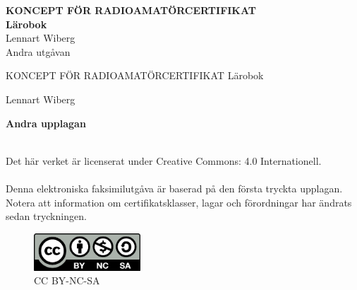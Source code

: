 \documentclass[a4paper,twoside,openright]{book}
\begin{document}
\AddToShipoutPicture*{\Backgroundtwo}

\pagestyle{empty}



\onecolumn
\vspace{3cm}
\begin{center}
\Huge{\bfseries{\color{white}KONCEPT FÖR RADIO\-AMATÖRCERTIFIKAT}} \\[2ex]
\Huge{\bfseries{\color{white}Lärobok}} \\[2ex]
\huge{\color{white}Lennart Wiberg} \\
\Large{\color{white}Andra utgåvan}
\end{center}

\clearpage





\vspace{10em}

\begin{center}
\Large{KONCEPT FÖR RADIOAMATÖRCERTIFIKAT}
\Large{Lärobok}

Lennart Wiberg\\[2\baselineskip]
\end{center}


\noindent \textbf{Andra upplagan}
\begin{rev-granskat}[UEI]
\noindent
\\ 
\noindent Det här verket är licenserat under Creative Commons:\newline
\noindent{} 4.0 Internationell.
\\
\\
\noindent Denna elektroniska faksimilutgåva är baserad på den första tryckta
upplagan. Notera att information om certifikatsklasser, lagar och förordningar
har ändrats sedan tryckningen.
\end{rev-granskat}

\begin{figure}
    \includegraphics[width=4cm]{images/cc-by-nc-sa}
    \caption*{CC BY-NC-SA}
\end{figure}
\end{document}
